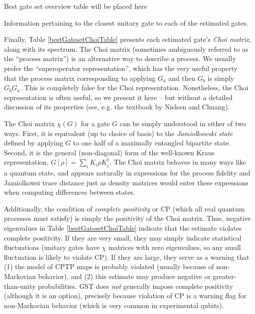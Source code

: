 \documentclass{article}[11pt]
\newcommand{\putfield}[2]{#2}
\begin{document}
\begin{table}[h]
\begin{center}
\putfield{bestGatesetClosestUnitaryTable}{Best gate set overview table will be placed here}
\caption{\putfield{tt_bestGatesetClosestUnitaryTable}{}Information pertaining to the closest unitary gate to each of the estimated gates.\label{bestGatesetClosestUnitaryTable}}
\end{center}
\end{table}


Finally, Table \ref{bestGatesetChoiTable} presents each estimated gate's \emph{Choi matrix}, along with its spectrum.  The Choi matrix (sometimes ambiguously referred to as the ``process matrix'') is an alternative way to describe a process.  We usually prefer the ``superoperator representation'', which has the very useful property that the process matrix corresponding to applying $G_a$ and then $G_b$ is simply $G_bG_a$.  This is completely false for the Choi representation.  Nonetheless, the Choi representation is often useful, so we present it here -- but without a detailed discussion of its properties (see, e.g. the textbook by Nielsen and Chuang).

The Choi matrix $\chi(G)$ for a gate $G$ can be simply understood in either of two ways.  First, it is equivalent (up to choice of basis) to the \emph{Jamiolkowski state} defined by applying $G$ to one half of a maximally entangled bipartite state.  Second, it is the general (non-diagonal) form of the well-known Kraus representation, $G[\rho] = \sum_i{K_i\rho K_i^\dagger}$.  The Choi matrix behaves in many ways like a quantum state, and appears naturally in expressions for the process fidelity and Jamiolkowsi trace distance just as density matrices would enter these expressions when computing differences between states.  

Additionally, the condition of \emph{complete positivity} or CP (which all real quantum processes must satisfy) is simply the positivity of the Choi matrix.  Thus, negative eigenvalues in Table \ref{bestGatesetChoiTable} indicate that the estimate violates complete positivity.  If they are very small, they may simply indicate statistical fluctuations (unitary gates have $\chi$ matrices with zero eigenvalues, so any small fluctuation is likely to violate CP).  If they are large, they serve as a warning that (1) the model of CPTP maps is probably violated (usually because of non-Markovian behavior), and (2) this estimate may produce negative or greater-than-unity probabilities.  GST does \emph{not} generally impose complete positivity (although it is an option), precisely because violation of CP is a warning flag for non-Markovian behavior (which is very common in experimental qubits).
\end{document}

